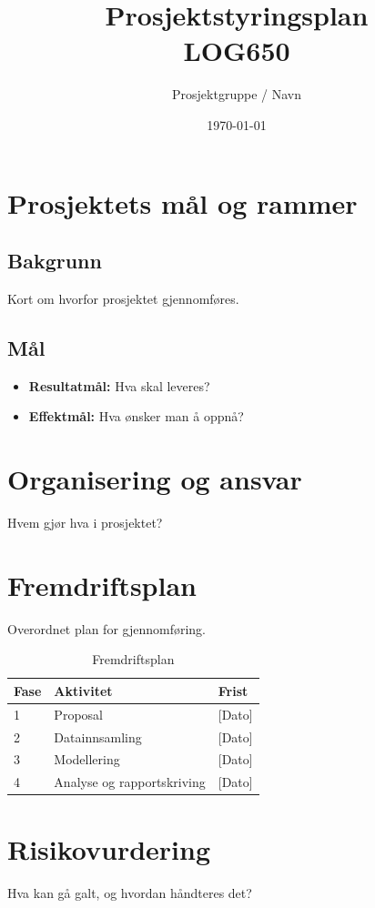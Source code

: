 \documentclass[a4paper,12pt]{article}
\title{Prosjektstyringsplan\\ \large LOG650}
\author{Prosjektgruppe / Navn}
\date{\today}
\begin{document}
\maketitle

\section{Prosjektets mål og rammer}
\subsection{Bakgrunn}
Kort om hvorfor prosjektet gjennomføres.

\subsection{Mål}
\begin{itemize}
    \item \textbf{Resultatmål:} Hva skal leveres?
    \item \textbf{Effektmål:} Hva ønsker man å oppnå?
\end{itemize}

\section{Organisering og ansvar}
Hvem gjør hva i prosjektet?

\section{Fremdriftsplan}
Overordnet plan for gjennomføring.

\begin{table}[h]
\centering
\begin{tabular}{|l|l|l|}
\hline
\textbf{Fase} & \textbf{Aktivitet} & \textbf{Frist} \\ \hline
1 & Proposal & [Dato] \\ \hline
2 & Datainnsamling & [Dato] \\ \hline
3 & Modellering & [Dato] \\ \hline
4 & Analyse og rapportskriving & [Dato] \\ \hline
\end{tabular}
\caption{Fremdriftsplan}
\end{table}

\section{Risikovurdering}
Hva kan gå galt, og hvordan håndteres det?
\end{document}
